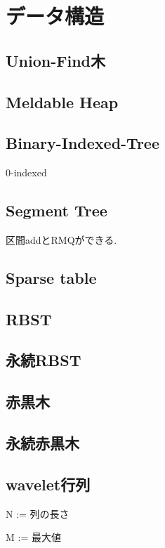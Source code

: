 \section{データ構造}
\subsection{Union-Find木}


\subsection{Meldable Heap}


\subsection{Binary-Indexed-Tree}
0-indexed

\subsection{Segment Tree}
区間addとRMQができる.


\subsection{Sparse table}


\subsection{RBST}


\subsection{永続RBST}


\subsection{赤黒木}

\subsection{永続赤黒木}

\subsection{wavelet行列}
N := 列の長さ\par
M := 最大値\\
